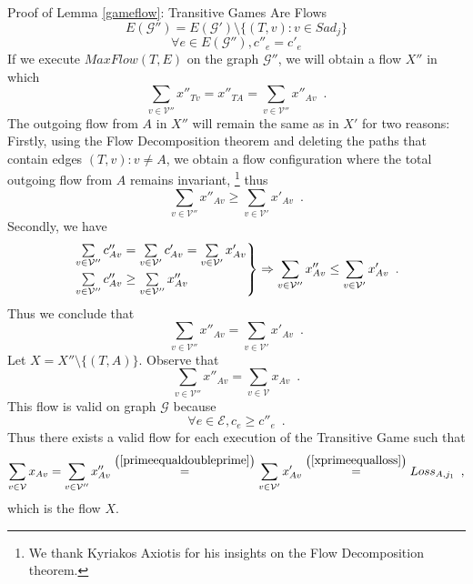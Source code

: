 \begin{sepproof}{Proof of Lemma \ref{gameflow}: Transitive Games Are Flows}
\begin{equation*}
    E(\mathcal{G}'') = E(\mathcal{G}') \setminus \{(T, v) : v \in Sad_j\}
  \end{equation*}
  \begin{equation*}
    \forall e \in E(\mathcal{G}''), c''_e = c'_e
  \end{equation*}
  If we execute $MaxFlow(T, E)$ on the graph $\mathcal{G}''$, we will obtain a flow $X''$ in which
  \begin{equation*}
    \sum\limits_{v \in \mathcal{V}''}x''_{Tv} = x''_{TA} = \sum\limits_{v \in \mathcal{V}''}x''_{Av} \enspace.
  \end{equation*}
  The outgoing flow from $A$ in $X''$ will remain the same as in $X'$ for two reasons: Firstly, using the Flow
  Decomposition theorem \cite{amo} and deleting the paths that contain edges $\left(T, v\right): v \neq A$, we
  obtain a flow configuration where the total outgoing flow from $A$ remains invariant,
     \footnote{We thank Kyriakos Axiotis for his insights on the Flow Decomposition theorem.}
  thus
  \begin{equation*}
    \sum\limits_{v \in \mathcal{V}''}x''_{Av} \geq \sum\limits_{v \in \mathcal{V}'}x'_{Av} \enspace.
  \end{equation*}
  Secondly, we have
  \begin{equation*}
    \begin{rcases}
      \sum\limits_{v \in \mathcal{V}''}c''_{Av} = \sum\limits_{v \in \mathcal{V}'}c'_{Av} = \sum\limits_{v \in
      \mathcal{V}'}x'_{Av} \\
      \sum\limits_{v \in \mathcal{V}''}c''_{Av} \geq \sum\limits_{v \in \mathcal{V}''}x''_{Av}
    \end{rcases}
    \Rightarrow \sum\limits_{v \in \mathcal{V}''}x''_{Av} \leq \sum\limits_{v \in \mathcal{V}'}x'_{Av} \enspace.
  \end{equation*}
  Thus we conclude that
  \begin{equation}
  \label{primeequaldoubleprime}
    \sum\limits_{v \in \mathcal{V}''}x''_{Av} = \sum\limits_{v \in \mathcal{V}'}x'_{Av} \enspace.
  \end{equation}
  Let $X = X'' \setminus \{(T, A)\}$. Observe that
  \begin{equation*}
    \sum\limits_{v \in \mathcal{V}''}x''_{Av} = \sum\limits_{v \in \mathcal{V}}x_{Av} \enspace.
  \end{equation*}
  This flow is valid on graph $\mathcal{G}$ because
  \begin{equation*}
    \forall e \in \mathcal{E}, c_e \geq c''_e \enspace.
  \end{equation*}
  Thus there exists a valid flow for each execution of the Transitive Game such that
  \begin{equation*}
    \sum\limits_{v \in \mathcal{V}}x_{Av} = \sum\limits_{v \in \mathcal{V}''}x''_{Av}
    \overset{\left(\ref{primeequaldoubleprime}\right)}{=} \sum\limits_{v \in \mathcal{V}'}x'_{Av}
    \overset{\left(\ref{xprimeequalloss}\right)}{=} Loss_{A, j_1} \enspace,
  \end{equation*}
  which is the flow $X$.
\end{sepproof}
